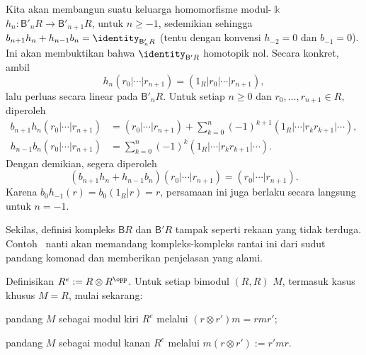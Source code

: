 \begin{bukti}
	Kita akan membangun suatu keluarga homomorfisme modul-$\Bbbk$
	$h_n:\mathsf{B}'_nR\to\mathsf{B}'_{n+1}R$, untuk $n\geq-1$, sedemikian
	sehingga
	$b_{n+1}h_n+h_{n-1}b_n=\identity_{\mathsf{B}'_nR}$ (tentu dengan konvensi
	$h_{-2}=0$ dan $b_{-1}=0$). Ini akan membuktikan bahwa
	$\identity_{\mathsf{B}'R}$ homotopik nol. Secara konkret, ambil
	\[ h_n(r_0 | \cdots | r_{n+1})
		= (1_R | r_0 | \cdots | r_{n+1}), \]
	lalu perluas secara linear pada $\mathsf{B}'_nR$. Untuk setiap $n\geq0$
	dan $r_0,\ldots,r_{n+1}\in R$, diperoleh
	\begin{align*}
		b_{n+1} h_n \left(r_0 | \cdots | r_{n+1} \right)
		& = (r_0 | \cdots | r_{n+1})
		+ \sum_{k=0}^n (-1)^{k+1}
		(1_R | \cdots | r_k r_{k+1} | \cdots), \\
		h_{n-1} b_n \left(r_0 | \cdots | r_{n+1} \right)
		& = \sum_{k=0}^n (-1)^k
		(1_R | \cdots | r_k r_{k+1} | \cdots).
	\end{align*}
	Dengan demikian, segera diperoleh
	\[ (b_{n+1} h_n + h_{n-1} b_n)(r_0 | \cdots | r_{n+1})
		= (r_0 | \cdots | r_{n+1}). \]
	Karena $b_0h_{-1}(r)=b_0(1_R|r)=r$, persamaan ini juga berlaku secara
	langsung untuk $n=-1$.
\end{bukti}

Sekilas, definisi kompleks $\mathsf{B}R$ dan $\mathsf{B}'R$ tampak seperti
rekaan yang tidak terduga.
Contoh~ nanti akan
memandang kompleks-kompleks rantai ini dari sudut pandang komonad dan
memberikan penjelasan yang alami.

\begin{konvensi}\label{con:Re-R-R}
	Definisikan $R^e:=R\otimes R^{\opp}$. Untuk setiap bimodul $(R,R)$ $M$,
	termasuk kasus khusus $M=R$, mulai sekarang:
	\begin{compactitem}
		\item pandang $M$ sebagai modul kiri $R^e$ melalui
		$(r\otimes r')m=rmr'$;
		\item pandang $M$ sebagai modul kanan $R^e$ melalui
		$m(r\otimes r'):=r'mr$.
	\end{compactitem}
\end{konvensi}

